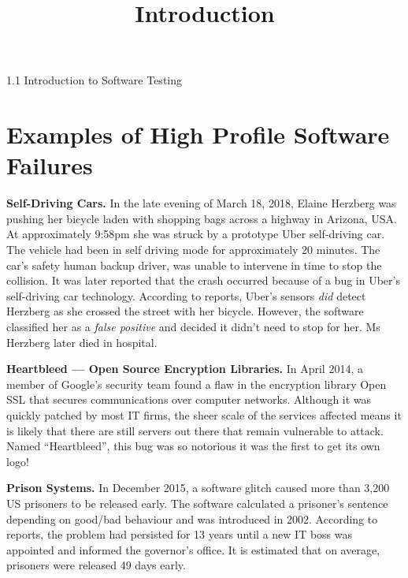 



\title{Introduction}{1.1 Introduction to Software Testing}


\section{Examples of High Profile Software Failures}

{\bf Self-Driving Cars.}
In the late evening of March 18, 2018, Elaine Herzberg was pushing her bicycle
laden with shopping bags across a highway in Arizona, USA. At approximately
9:58pm she was struck by a prototype Uber self-driving car. The vehicle had been
in self driving mode for approximately 20 minutes. The car's safety human backup
driver, was unable to intervene in time to stop the collision. It was later
reported that the crash occurred because of a bug in Uber's self-driving car
technology. According to reports, Uber's sensors {\it did} detect Herzberg as
she crossed the street with her bicycle. However, the software classified her as
a {\it false positive} and decided it didn't need to stop for her. Ms Herzberg
later died in hospital.

{\bf Heartbleed --- Open Source Encryption Libraries.}
In April 2014, a member of Google's security team found a flaw in the encryption
library Open SSL that secures communications over computer networks. Although it
was quickly patched by most IT firms, the sheer scale of the services affected
means it is likely that there are still servers out there that remain vulnerable
to attack. Named ``Heartbleed'', this bug was so notorious it was the first to
get its own logo!

{\bf Prison Systems.}
In December 2015, a software glitch caused more than 3,200 US prisoners to be
released early. The software calculated a prisoner's sentence depending on
good/bad behaviour and was introduced in 2002. According to reports, the problem
had persisted for 13 years until a new IT boss was appointed and informed
the governor's office. It is estimated that on average, prisoners were released
49 days early.


